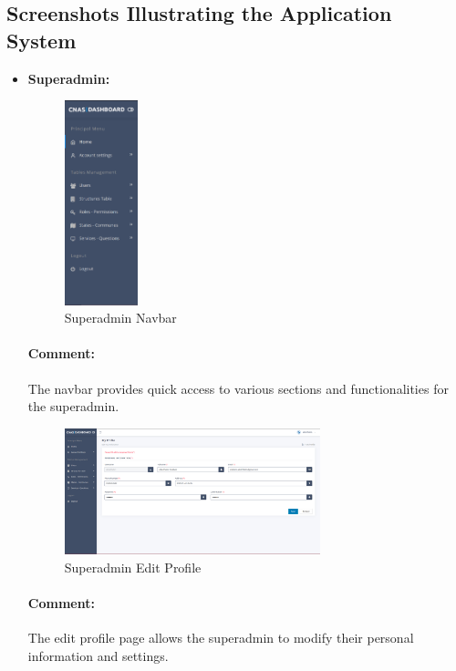 \subsection{Screenshots Illustrating the Application System}

\bigskip
\begin{itemize}
    \item \textbf{Superadmin:}
\begin{figure}[htbp]
  \centering
  \includegraphics[width=0.2\textwidth]{SCREENSHOTS/superadmin/navbar.png}
  \caption{Superadmin Navbar}
  \label{fig:navbar}
\end{figure}
\paragraph{Comment:} The navbar provides quick access to various sections and functionalities for the superadmin.
\newpage

\begin{figure}[htbp]
  \centering
  \includegraphics[width=0.7\textwidth]{SCREENSHOTS/superadmin/edit_profile.png}
  \caption{Superadmin Edit Profile}
  \label{fig:edit-profile}
\end{figure}
\paragraph{Comment:} The edit profile page allows the superadmin to modify their personal information and settings.


\end{itemize}
